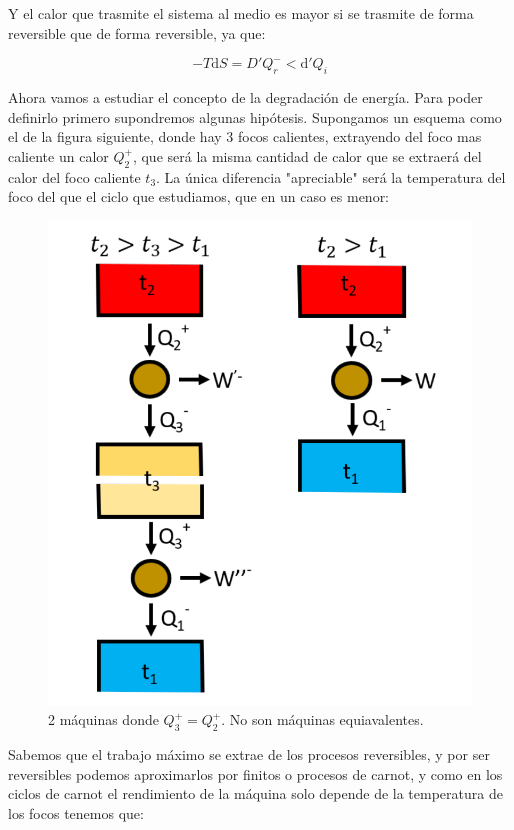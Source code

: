 \documentclass[12pt,a4paper]{article}
\newcommand{\D}{\mathrm{d}}
\begin{document}
Y el calor que trasmite el sistema al medio es mayor si se trasmite de forma reversible que de forma reversible, ya que:

$$ -T \D S = D ' Q_r^- < \D ' Q_i $$
 

Ahora  vamos a estudiar el concepto de la degradación de energía. Para  poder definirlo primero supondremos algunas hipótesis. Supongamos un esquema como el de la figura siguiente, donde hay 3 focos calientes, extrayendo del foco mas caliente un calor $Q_2^+$, que será la misma cantidad de calor que se extraerá del calor del foco caliente $t_3$. La única diferencia "apreciable" será la temperatura del foco del que el ciclo que estudiamos, que en un caso es menor:

\begin{figure}[h!] \centering
\includegraphics[scale=0.6]{Temperatura-absoluta-carnot.png}
\caption{2 máquinas donde $Q_3^+ = Q_2^+$. No son máquinas equiavalentes.}
\label{fig:5-degradacion-energia}
\end{figure}

Sabemos que el trabajo máximo se extrae de los procesos reversibles, y por ser reversibles podemos aproximarlos por finitos o procesos de carnot, y como en los ciclos de carnot el rendimiento de la máquina solo depende de la temperatura de los focos tenemos que:
\end{document}
